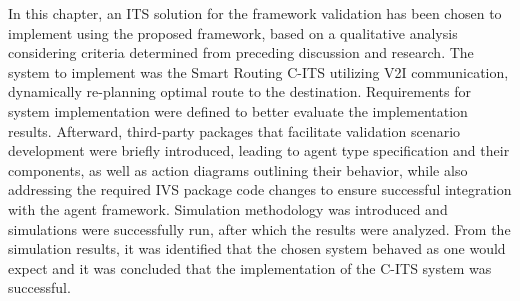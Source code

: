 \documentclass[main.tex]{subfiles}
\begin{document}
In this chapter, an ITS solution for the framework validation has been chosen to implement
using the proposed framework, based on a qualitative analysis considering criteria determined
from preceding discussion and research. The system to implement was the Smart Routing C-ITS
utilizing V2I communication, dynamically re-planning optimal route to the destination. Requirements
for system implementation were defined to better evaluate the implementation results.
Afterward, third-party packages that facilitate validation scenario development were briefly
introduced, leading to agent type specification and their components, as well as
action diagrams outlining their behavior, while also addressing the required IVS package code
changes to ensure successful integration with the agent framework. Simulation methodology was
introduced and simulations were successfully run, after which the results were analyzed. From the 
simulation results, it was identified that the chosen system behaved as one would expect and it
was concluded that the implementation of the C-ITS system was successful. 
\end{document}
